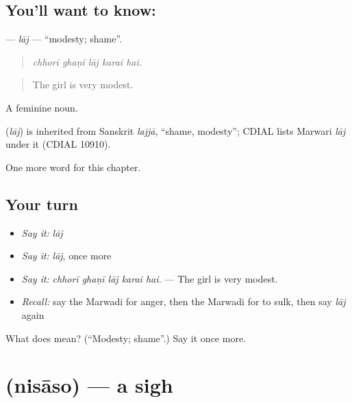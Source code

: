 \subsection*{You'll want to know: }
\textbf{} — \emph{lāj} — \textquotedblleft{}modesty; shame\textquotedblright{}.

\begin{quote}
    
\end{quote}

\begin{quote}
\emph{chhorī ghaṇī lāj karai hai.}
\end{quote}

\begin{quote}
The girl is very modest.
\end{quote}

A feminine noun.

\begin{cousinweb}
\textbf{} (\emph{lāj}) is inherited from Sanskrit \emph{lajjā}, \textquotedblleft{}shame, modesty\textquotedblright{}; CDIAL lists Marwari \emph{lāj} under it (CDIAL 10910).
\end{cousinweb}

\begin{grammarlens}[title={What you've built}]
One more word for this chapter.
\end{grammarlens}

\subsection*{Your turn}
\begin{itemize}
\raggedright
  \item \emph{Say it:} \emph{lāj}
  \item \emph{Say it:} \emph{lāj}, once more
  \item \emph{Say it:} \emph{chhorī ghaṇī lāj karai hai.} — The girl is very modest.
  \item \emph{Recall:} say the Marwadi for anger, then the Marwadi for to sulk, then say \emph{lāj} again
\end{itemize}

\begin{tcolorbox}[breakable,colback=teal!4,colframe=teal!35!black,title={Before you move on}]
What does  mean? (\textquotedblleft{}Modesty; shame\textquotedblright{}.) Say it once more.
\end{tcolorbox}
\section[\texorpdfstring{\mw{निसासो} (nisāso)}{निसासो (nisāso)}]{ (nisāso) — a sigh}

